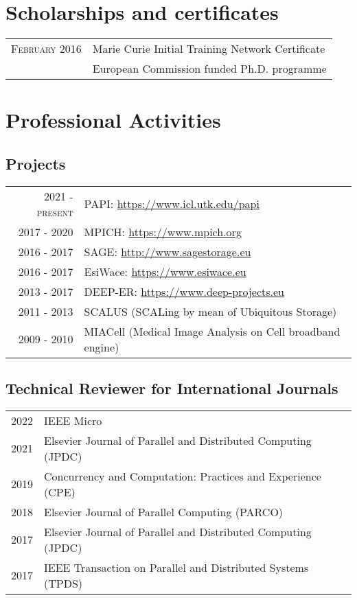 \documentclass[a4paper,10pt]{article}
\begin{document}
\section{Scholarships and certificates}
\begin{tabular}{rp{11cm}}
\textsc{February} 2016 & Marie Curie Initial Training Network Certificate \\
          & \footnotesize{European Commission funded Ph.D. programme}
\end{tabular}

\section{Professional Activities}
\subsection*{Projects}
\begin{tabular}{rp{11cm}}
\textsc{2021 - present} & PAPI: \url{https://www.icl.utk.edu/papi} \\
\textsc{2017 - 2020}    & MPICH: \url{https://www.mpich.org} \\
\textsc{2016 - 2017}    & SAGE: \url{http://www.sagestorage.eu} \\
\textsc{2016 - 2017}    & EsiWace: \url{https://www.esiwace.eu} \\
\textsc{2013 - 2017}    & DEEP-ER: \url{https://www.deep-projects.eu} \\
\textsc{2011 - 2013}    & SCALUS (SCALing by mean of Ubiquitous Storage) \\
\textsc{2009 - 2010}    & MIACell (Medical Image Analysis on Cell broadband engine) \\
\end{tabular}

\subsection*{Technical Reviewer for International Journals}
\begin{tabular}{rp{11cm}}
    2022 & IEEE Micro \\
    2021 & Elsevier Journal of Parallel and Distributed Computing (JPDC) \\
    2019 & Concurrency and Computation: Practices and Experience (CPE) \\
    2018 & Elsevier Journal of Parallel Computing (PARCO) \\
    2017 & Elsevier Journal of Parallel and Distributed Computing (JPDC)\\
    2017 & IEEE Transaction on Parallel and Distributed Systems (TPDS)\\
\end{tabular}
\end{document}
